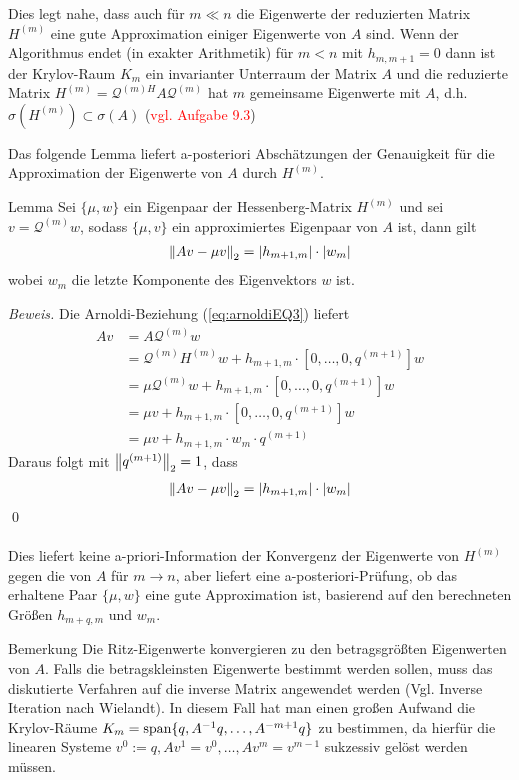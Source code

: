 Dies legt nahe, dass auch für $m\ll n$ die Eigenwerte der reduzierten Matrix $H^{(m)}$ eine gute Approximation 
einiger Eigenwerte von $A$ sind. Wenn der Algorithmus endet (in exakter Arithmetik) für $m<n$ mit $h_{m,m+1} = 0$ dann
ist der Krylov-Raum $K_m$ ein invarianter Unterraum der Matrix $A$ und die reduzierte Matrix $H^{(m)} = 
{\mathcal{Q}^{(m)H}} A \mathcal{Q}^{(m)}$ hat $m$ gemeinsame Eigenwerte mit $A$, 
d.h. $\sigma(H^{(m)})\subset \sigma(A)$ (\textcolor{red}{vgl. Aufgabe 9.3})

Das folgende Lemma liefert a-posteriori Abschätzungen der Genauigkeit für die Approximation der Eigenwerte von $A$ durch 
$H^{(m)}$.

\begin{colbox}{Lemma}
  Sei $\{\mu,w\}$ ein Eigenpaar der Hessenberg-Matrix $H^{(m)}$ und sei $v=\mathcal{Q}^{(m)}w$, sodass $\{\mu,v\}$ ein 
  approximiertes Eigenpaar von $A$ ist, dann gilt
  \begin{align*}
    \vertn{2}{Av-\mu v}_2 = |h_{m+1,m}|\cdot |w_m|
  \end{align*} 
  wobei $w_m$ die letzte Komponente des Eigenvektors $w$ ist.
\end{colbox}

\textit{Beweis.} Die Arnoldi-Beziehung (\ref{eq:arnoldiEQ3}) liefert
%
\begin{align*}
Av 
&= A\mathcal{Q}^{(m)}w\\ 
&= \mathcal{Q}^{(m)}H^{(m)}w + h_{m+1,m}\cdot[0,\dots,0,q^{(m+1)}]w \\
&= \mu \mathcal{Q}^{(m)}w + h_{m+1,m}\cdot[0,\dots,0,q^{(m+1)}]w \\
&= \mu v + h_{m+1,m}\cdot[0,\dots,0,q^{(m+1)}]w \\
&= \mu v + h_{m+1,m}\cdot w_m \cdot q^{(m+1)}
\end{align*}
%
Daraus folgt mit $\vertn{2}{q^{(m+1)}}_2 = 1$, dass
\begin{align*}\vertn{2}{Av-\mu v}_2 
  = |h_{m+1,m}|\cdot |w_m|
\end{align*}
\qed \\ \\
Dies liefert keine a-priori-Information der Konvergenz der Eigenwerte von $H^{(m)}$ gegen die von $A$ für $m\to n$, aber
liefert eine a-posteriori-Prüfung, ob das erhaltene Paar 
$\{\mu,w\}$ eine gute Approximation ist, basierend auf den berechneten Größen $h_{m+q,m}$ und $w_m$.

\begin{colbox}{Bemerkung}
  Die Ritz-Eigenwerte konvergieren zu den betragsgrößten Eigenwerten von $A$. Falls die betragskleinsten Eigenwerte 
  bestimmt werden sollen, muss das diskutierte Verfahren auf die inverse Matrix angewendet werden (Vgl. Inverse 
  Iteration nach Wielandt). In diesem Fall hat man einen großen Aufwand die Krylov-Räume 
  $K_m = \text{span}\{q,A^{-1}q,\dots,A^{-m+1}q\}$ zu bestimmen, da hierfür die linearen Systeme $v^0:=q, Av^1=v^0, 
  \dots, Av^m=v^{m-1}$ sukzessiv gelöst werden müssen.
\end{colbox}

